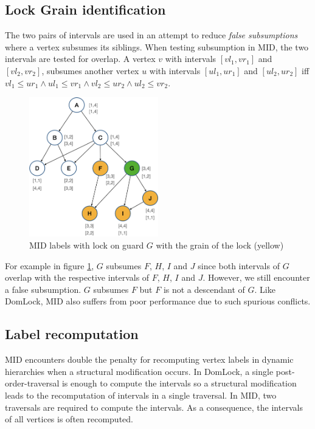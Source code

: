 \subsection{Lock Grain identification}

The two pairs of intervals are used in an attempt to reduce \emph{false subsumptions} where a vertex subsumes its siblings. When testing subsumption in MID, the two intervals are tested for overlap. A vertex $v$ with intervals $[vl_1, vr_1]$ and $[vl_2, vr_2]$, subsumes another vertex $u$ with intervals $[ul_1, ur_1]$ and $[ul_2, ur_2]$ iff $vl_1 \leq ur_1 \land ul_1 \leq vr_1 \land vl_2 \leq ur_2 \land ul_2 \leq vr_2$.

\begin{figure}[H]
    \centering
    \captionsetup{justification=centering}
    \includegraphics[width=0.5\textwidth]{figures/MID_example_with_lock.png}
    \caption{MID labels with lock on guard $G$ with the grain of the lock (yellow)}
    \label{fig:MID_example_locked}
\end{figure}

For example in figure \ref{fig:MID_example_locked}, $G$ subsumes $F$, $H$, $I$ and $J$ since both intervals of $G$ overlap with the respective intervals of $F$, $H$, $I$ and $J$. However, we still encounter a false subsumption. $G$ subsumes $F$ but $F$ is not a descendant of $G$. Like DomLock, MID also suffers from poor performance due to such spurious conflicts.

\subsection{Label recomputation}
MID encounters double the penalty for recomputing vertex labels in dynamic hierarchies when a structural modification occurs. In DomLock, a single post-order-traversal is enough to compute the intervals so a structural modification leads to the recomputation of intervals in a single traversal. In MID, two traversals are required to compute the intervals. As a consequence, the intervals of all vertices is often recomputed. 

